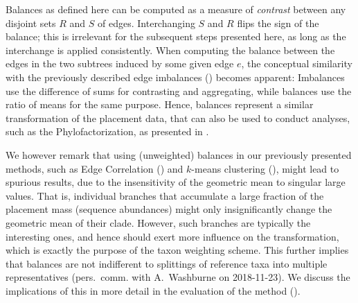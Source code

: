 Balances as defined here can be computed as a measure of \emph{contrast} between any disjoint sets $R$ and $S$ of edges.
Interchanging $S$ and $R$ flips the sign of the balance;
this is irrelevant for the subsequent steps presented here, as long as the interchange is applied consistently.
When computing the balance between the edges in the two subtrees induced by some given edge $e$,
the conceptual similarity with the previously described edge imbalances 
() becomes apparent:
Imbalances use the difference of sums for contrasting and aggregating,
while balances use the ratio of means for the same purpose.
Hence, balances represent a similar transformation of the placement data,
that can also be used to conduct analyses, such as the Phylofactorization, as presented in .

We however remark that using (unweighted) balances in our previously presented methods,
such as Edge Correlation ()
and $k$-means clustering (),
might lead to spurious results, due to the insensitivity of the geometric mean to singular large values.
That is, individual branches that accumulate a large fraction of the placement mass (sequence abundances)
might only insignificantly change the geometric mean of their clade.
However, such branches are typically the interesting ones,
and hence should exert more influence on the transformation, which is exactly the purpose of the taxon weighting scheme.
This further implies that balances are not indifferent to splittings of reference taxa into multiple representatives
(pers.~comm. with A.~Washburne on 2018-11-23).
We discuss the implications of this in more detail in the evaluation of the method ().


